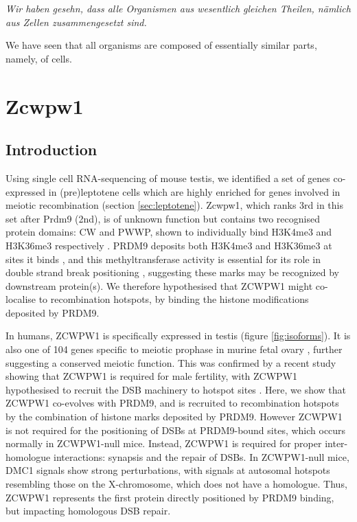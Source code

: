 \begin{savequote}[8cm]
\textit{Wir haben gesehn, dass alle Organismen aus wesentlich gleichen Theilen, nämlich aus Zellen zusammengesetzt sind.}

We have seen that all organisms are composed of essentially similar parts, namely, of cells.
\end{savequote}

\chapter{\label{ch:3-Zcw} Zcwpw1}

\minitoc

\section{Introduction}

Using single cell RNA-sequencing of mouse testis, we identified a set of genes co-expressed in (pre)leptotene cells which are highly enriched for genes involved in meiotic recombination (section \ref{sec:leptotene}). Zcwpw1, which ranks 3rd in this set after Prdm9 (2nd), is of unknown function but contains two recognised protein domains: CW and PWWP, shown to individually bind H3K4me3 and H3K36me3 respectively \cite{He2010Complex, Rona2016PWWP}. PRDM9 deposits both H3K4me3 and H3K36me3 at sites it binds \cite{Powers2016Meiotic}, and this methyltransferase activity is essential for its role in double strand break positioning \cite{Diagouraga2018PRDM9}, suggesting these marks may be recognized by downstream protein(s). We therefore hypothesised that ZCWPW1 might co-localise to recombination hotspots, by binding the histone modifications deposited by PRDM9.

In humans, ZCWPW1 is specifically expressed in testis \parencite{Carithers2015novel, Uhlen2015Tissuebased} (figure \ref{fig:isoforms}). It is also one of 104 genes specific to meiotic prophase in murine fetal ovary \parencite{Soh2015Gene}, further suggesting a conserved meiotic function. This was confirmed by a recent study showing that ZCWPW1 is required for male fertility, with ZCWPW1 hypothesised to recruit the DSB machinery to hotspot sites \parencite{Li2019histone}. Here, we show that ZCWPW1 co-evolves with PRDM9, and is recruited to recombination hotspots by the combination of histone marks deposited by PRDM9. However ZCWPW1 is not required for the positioning of DSBs at PRDM9-bound sites, which occurs normally in ZCWPW1-null mice. Instead, ZCWPW1 is required for proper inter-homologue interactions: synapsis and the repair of DSBs. In ZCWPW1-null mice, DMC1 signals show strong perturbations, with signals at autosomal hotspots resembling those on the X-chromosome, which does not have a homologue. Thus, ZCWPW1 represents the first protein directly positioned by PRDM9 binding, but impacting homologous DSB repair.

